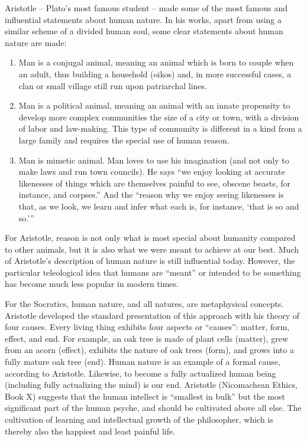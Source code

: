 Aristotle – Plato’s most famous student – made some of the most famous and influential statements about human nature. In his works, apart from using a similar scheme of a divided human soul, some clear statements about human nature are made:
\begin{enumerate}
\item Man is a conjugal animal, meaning an animal which is born to couple when an adult, thus building a household (oikos) and, in more successful cases, a clan or small village still run upon patriarchal lines.
\item Man is a political animal, meaning an animal with an innate propensity to develop more complex communities the size of a city or town, with a division of labor and law-making. This type of community is different in a kind from a large family and requires the special use of human reason.
\item Man is mimetic animal. Man loves to use his imagination (and not only to make laws and run town councils). He says ``we enjoy looking at accurate likenesses of things which are themselves painful to see, obscene beasts, for instance, and corpses.''  And the ``reason why we enjoy seeing likenesses is that, as we look, we learn and infer what each is, for instance, ‘that is so and so.’''
\end{enumerate}
For Aristotle, reason is not only what is most special about humanity compared to other animals, but it is also what we were meant to achieve at our best. Much of Aristotle’s description of human nature is still influential today. However, the particular teleological idea that humans are ``meant'' or intended to be something has become much less popular in modern times.

For the Socratics, human nature, and all natures, are metaphysical concepts. Aristotle developed the standard presentation of this approach with his theory of four causes. Every living thing exhibits four aspects or ``causes'': matter, form, effect, and end. For example, an oak tree is made of plant cells (matter), grew from an acorn (effect), exhibits the nature of oak trees (form), and grows into a fully mature oak tree (end). Human nature is an example of a formal cause, according to Aristotle. Likewise, to become a fully actualized human being (including fully actualizing the mind) is our end. Aristotle (Nicomachean Ethics, Book X) suggests that the human intellect is ``smallest in bulk'' but the most significant part of the human psyche, and should be cultivated above all else. The cultivation of learning and intellectual growth of the philosopher, which is thereby also the happiest and least painful life.

